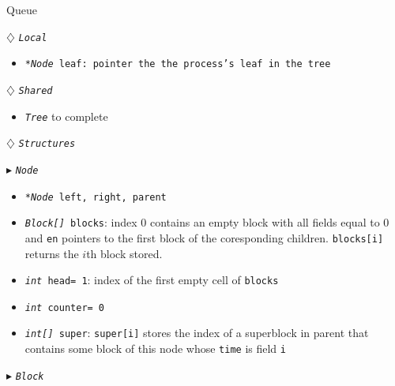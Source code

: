 \documentclass[10pt]{article}
\theoremstyle{definition}
\begin{document}
\begin{algorithm}
\caption{Queue \label{algQ}}
\begin{algorithmic}[1]
\begin{multicols}{2}


\Statex $\diamondsuit$ \texttt{\textsl{Local}}
\begin{itemize}
\item \texttt{\textsl{*Node} leaf\textsf{: pointer the the process's leaf in the tree}}
\end{itemize}

\Statex

\Statex $\diamondsuit$ \texttt{\textsl{Shared}}
\begin{itemize}
\item \texttt{\textsl{Tree}} to complete
\end{itemize}

\Statex
\Statex $\diamondsuit$ \texttt{\textsl{Structures}}

\Statex $\blacktriangleright$ \texttt{\textsl{Node}}
\begin{itemize}
\item \texttt{\textsl{*Node} left, right, parent}
\item \texttt{\textsl{Block[]} blocks}\textsf{: index 0 contains an empty block with all fields equal to 0 and \texttt{en} pointers to the first block of the coresponding children. \texttt{blocks[i]} returns the $i$th block stored.}
\item \texttt{\textsl{int} head= 1}\textsf{: index of the first empty cell of \texttt{blocks}}
\item \texttt{\textsl{int} counter= 0}\textsf{}
\item \texttt{\textsl{int[]} super}\textsf{: \texttt{super[i]} stores the index of a superblock in parent that contains some block of this node whose \texttt{time} is field \texttt{i}}
\end{itemize}


\Statex $\blacktriangleright$ \texttt{\textsl{Block}}


\end{multicols}
\end{algorithmic}
\end{algorithm}
\end{document}

